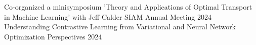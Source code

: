 

\begingroup
\allowdisplaybreaks
\begin{cvtalks}

\cvtalk
    {Co-organized a minisymposium 'Theory and Applications of Optimal Transport in Machine Learning' with Jeff Calder} %
    {SIAM Annual Meeting 2024}
    {Understanding Contrastive Learning from Variational and Neural Network Optimization Perspectives} %
    {2024} %
\end{cvtalks}
\endgroup

